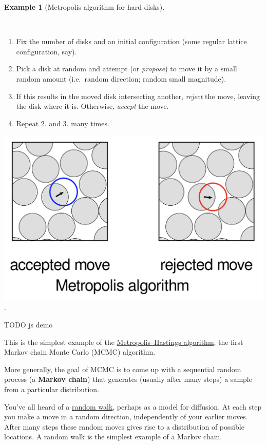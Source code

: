 \documentclass[
  letterpaper,
  DIV=11,
  numbers=noendperiod]{scrreprt}
\providecommand{\tightlist}{%
  \setlength{\itemsep}{0pt}\setlength{\parskip}{0pt}}\usepackage{longtable,booktabs,array}
\theoremstyle{definition}
\newtheorem{example}{Example}[chapter]
\theoremstyle{remark}
\begin{document}
\leavevmode{}%
\begin{example}[Metropolis algorithm for hard
disks]\label{exm-metropolis}

~

\begin{enumerate}
\def\labelenumi{\arabic{enumi}.}
\tightlist
\item
  Fix the number of disks and an initial configuration (some regular
  lattice configuration, say).
\item
  Pick a disk at random and attempt (or \emph{propose}) to move it by a
  small random amount (i.e.~random direction; random small magnitude).
\item
  If this results in the moved disk intersecting another, \emph{reject}
  the move, leaving the disk where it is. Otherwise, \emph{accept} the
  move.
\item
  Repeat 2. and 3. many times.
\end{enumerate}

\end{example}

\includegraphics{./assets/metropolis.png}.

TODO js demo

This is the simplest example of the
\href{https://en.wikipedia.org/wiki/Metropolis\%E2\%80\%93Hastings_algorithm}{Metropolis--Hastings
algorithm}, the first Markov chain Monte Carlo (MCMC) algorithm.

More generally, the goal of MCMC is to come up with a sequential random
process (a \textbf{Markov chain}) that generates (usually after many
steps) a sample from a particular distribution.

You've all heard of a
\href{https://en.wikipedia.org/wiki/Random_walk}{random walk}, perhaps
as a model for diffusion. At each step you make a move in a random
direction, independently of your earlier moves. After many steps these
random moves gives rise to a distribution of possible locations. A
random walk is the simplest example of a Markov chain.
\end{document}
